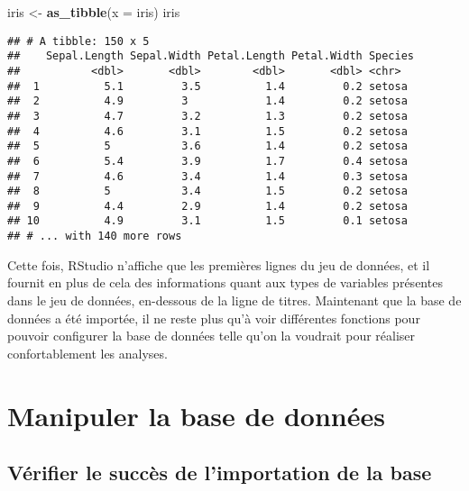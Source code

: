 \documentclass[
  french,
]{book}
\newenvironment{Shaded}{\begin{snugshade}}{\end{snugshade}}
\newcommand{\DataTypeTok}[1]{\textcolor[rgb]{0.13,0.29,0.53}{#1}}
\newcommand{\KeywordTok}[1]{\textcolor[rgb]{0.13,0.29,0.53}{\textbf{#1}}}
\newcommand{\NormalTok}[1]{#1}
\newcommand{\StringTok}[1]{\textcolor[rgb]{0.31,0.60,0.02}{#1}}
\begin{document}
\begin{Shaded}
\begin{Highlighting}[]
\NormalTok{iris <-}\StringTok{ }\KeywordTok{as_tibble}\NormalTok{(}\DataTypeTok{x =}\NormalTok{ iris)}
\NormalTok{iris}
\end{Highlighting}
\end{Shaded}

\begin{verbatim}
## # A tibble: 150 x 5
##    Sepal.Length Sepal.Width Petal.Length Petal.Width Species
##           <dbl>       <dbl>        <dbl>       <dbl> <chr>  
##  1          5.1         3.5          1.4         0.2 setosa 
##  2          4.9         3            1.4         0.2 setosa 
##  3          4.7         3.2          1.3         0.2 setosa 
##  4          4.6         3.1          1.5         0.2 setosa 
##  5          5           3.6          1.4         0.2 setosa 
##  6          5.4         3.9          1.7         0.4 setosa 
##  7          4.6         3.4          1.4         0.3 setosa 
##  8          5           3.4          1.5         0.2 setosa 
##  9          4.4         2.9          1.4         0.2 setosa 
## 10          4.9         3.1          1.5         0.1 setosa 
## # ... with 140 more rows
\end{verbatim}

Cette fois, RStudio n'affiche que les premières lignes du jeu de données, et il fournit en plus de cela des informations quant aux types de variables présentes dans le jeu de données, en-dessous de la ligne de titres. Maintenant que la base de données a été importée, il ne reste plus qu'à voir différentes fonctions pour pouvoir configurer la base de données telle qu'on la voudrait pour réaliser confortablement les analyses.

\hypertarget{manipuler-la-base-de-donnuxe9es}{%
\section{Manipuler la base de données}\label{manipuler-la-base-de-donnuxe9es}}

\hypertarget{vuxe9rifier-le-succuxe8s-de-limportation-de-la-base}{%
\subsection{Vérifier le succès de l'importation de la base}\label{vuxe9rifier-le-succuxe8s-de-limportation-de-la-base}}
\end{document}
